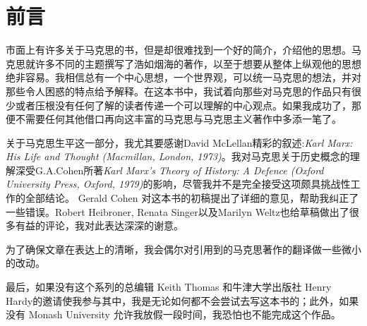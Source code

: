 \section{前言}
市面上有许多关于马克思的书，但是却很难找到一个好的简介，介绍他的思想。马克思就许多不同的主题撰写了浩如烟海的著作，以至于想要从整体上纵观他的思想绝非容易。我相信总有一个中心思想，一个世界观，可以统一马克思的想法，并对那些令人困惑的特点给予解释。在这本书中，我试着向那些对马克思的作品只有很少或者压根没有任何了解的读者传递一个可以理解的中心观点。如果我成功了，那便不需要任何其他借口再向这丰富的马克思与马克思主义著作中多添一笔了。

关于马克思生平这一部分，我尤其要感谢David McLellan精彩的叙述:\textit{Karl Marx: His Life and Thought (Macmillan, London, 1973)}。我对马克思关于历史概念的理解深受G.A.Cohen所著\textit{Karl Marx’s Theory of History: A Defence (Oxford University Press, Oxford, 1979)}的影响，尽管我并不是完全接受这项颇具挑战性工作的全部结论。 Gerald Cohen 对这本书的初稿提出了详细的意见，帮助我纠正了一些错误。Robert Heibroner, Renata Singer以及Marilyn Weltz也给草稿做出了很多有益的评论，我对此表达深深的谢意。

为了确保文章在表达上的清晰，我会偶尔对引用到的马克思著作的翻译做一些微小的改动。

最后，如果没有这个系列的总编辑 Keith Thomas 和牛津大学出版社 Henry Hardy的邀请使我参与其中，我是无论如何都不会尝试去写这本书的；此外，如果没有 Monash University 允许我放假一段时间，我恐怕也不能完成这个作品。



